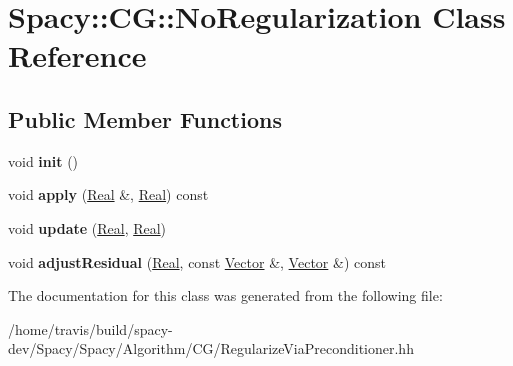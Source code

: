 \hypertarget{classSpacy_1_1CG_1_1NoRegularization}{\section{Spacy\-:\-:C\-G\-:\-:No\-Regularization Class Reference}
\label{classSpacy_1_1CG_1_1NoRegularization}
}
\subsection*{Public Member Functions}
\begin{DoxyCompactItemize}
\item 
\hypertarget{classSpacy_1_1CG_1_1NoRegularization_aefc9fb0d0fbe98a538838f99ed583d4c}{void {\bfseries init} ()}\label{classSpacy_1_1CG_1_1NoRegularization_aefc9fb0d0fbe98a538838f99ed583d4c}

\item 
\hypertarget{classSpacy_1_1CG_1_1NoRegularization_a2d5a8f96e3ececc08bdb2b875929d3b1}{void {\bfseries apply} (\hyperlink{classSpacy_1_1Real}{Real} \&, \hyperlink{classSpacy_1_1Real}{Real}) const }\label{classSpacy_1_1CG_1_1NoRegularization_a2d5a8f96e3ececc08bdb2b875929d3b1}

\item 
\hypertarget{classSpacy_1_1CG_1_1NoRegularization_a2c687a9232ae4185ca4b8f0a82b33da0}{void {\bfseries update} (\hyperlink{classSpacy_1_1Real}{Real}, \hyperlink{classSpacy_1_1Real}{Real})}\label{classSpacy_1_1CG_1_1NoRegularization_a2c687a9232ae4185ca4b8f0a82b33da0}

\item 
\hypertarget{classSpacy_1_1CG_1_1NoRegularization_a9c3efd0da176901aa983f9d77b61f805}{void {\bfseries adjust\-Residual} (\hyperlink{classSpacy_1_1Real}{Real}, const \hyperlink{classSpacy_1_1Vector}{Vector} \&, \hyperlink{classSpacy_1_1Vector}{Vector} \&) const }\label{classSpacy_1_1CG_1_1NoRegularization_a9c3efd0da176901aa983f9d77b61f805}

\end{DoxyCompactItemize}


The documentation for this class was generated from the following file\-:\begin{DoxyCompactItemize}
\item 
/home/travis/build/spacy-\/dev/\-Spacy/\-Spacy/\-Algorithm/\-C\-G/Regularize\-Via\-Preconditioner.\-hh\end{DoxyCompactItemize}
